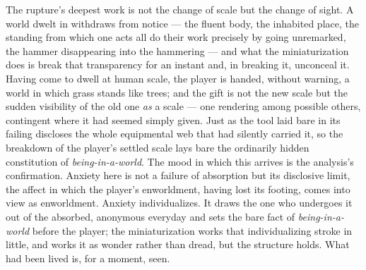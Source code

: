 \documentclass{article}
\begin{document}
The rupture's deepest work is not the change of scale but the change of sight. A world dwelt in withdraws from notice — the fluent body, the inhabited place, the standing from which one acts all do their work precisely by going unremarked, the hammer disappearing into the hammering — and what the miniaturization does is break that transparency for an instant and, in breaking it, unconceal it. Having come to dwell at human scale, the player is handed, without warning, a world in which grass stands like trees; and the gift is not the new scale but the sudden visibility of the old one \textit{as} a scale — one rendering among possible others, contingent where it had seemed simply given. Just as the tool laid bare in its failing discloses the whole equipmental web that had silently carried it, so the breakdown of the player's settled scale lays bare the ordinarily hidden constitution of \textit{being-in-a-world}. The mood in which this arrives is the analysis's confirmation. Anxiety here is not a failure of absorption but its disclosive limit, the affect in which the player's enworldment, having lost its footing, comes into view as enworldment. Anxiety individualizes. It draws the one who undergoes it out of the absorbed, anonymous everyday and sets the bare fact of \textit{being-in-a-world} before the player; the miniaturization works that individualizing stroke in little, and works it as wonder rather than dread, but the structure holds. What had been lived is, for a moment, seen.
\end{document}

